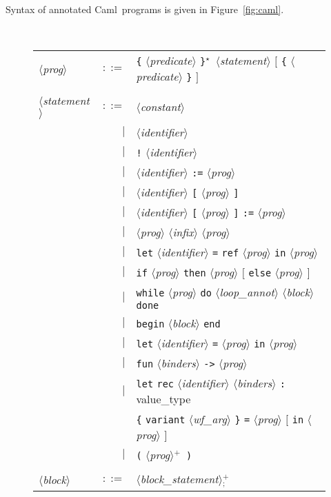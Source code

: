 \documentclass[a4paper,12pt]{report}
\newcommand{\caml}{\textsf{Caml}}
\newcommand{\te}[1]{\texttt{#1}}
\newcommand{\nt}[1]{$\langle$\textsl{#1}$\rangle$}
\newcommand{\etoile}{$^{\star}$}
\newcommand{\plus}{$^+$}
\newcommand{\plussep}[1]{$^+_#1$}
\begin{document}
Syntax of annotated \caml\ programs is given in Figure~\ref{fig:caml}.
\begin{figure}[htbp]
\begin{center}
\hrulefill\\
\begin{tabular}{lrl}
  \nt{prog} 
    & $::=$ & \te{\{} \nt{predicate} \te{\}}\etoile\
              \nt{statement} 
              $[$ \te{\{} \nt{predicate} \te{\}} $]$ \\

       & & \\[0.1em]

  \nt{statement}
    & $::=$ & \nt{constant} \\
      & $|$ & \nt{identifier} \\
      & $|$ & \te{!} \nt{identifier} \\
      & $|$ & \nt{identifier} \te{:=} \nt{prog} \\
      & $|$ & \nt{identifier} \te{[} \nt{prog} \te{]} \\
      & $|$ & \nt{identifier} \te{[} \nt{prog} \te{]} \te{:=} \nt{prog} \\
      & $|$ & \nt{prog} \nt{infix} \nt{prog} \\
      & $|$ & \te{let} \nt{identifier} \te{=} \te{ref} 
              \nt{prog} \te{in} \nt{prog} \\
      & $|$ & \te{if} \nt{prog} \te{then} \nt{prog}
              $[$ \te{else} \nt{prog} $]$ \\
      & $|$ & \te{while} \nt{prog} \te{do}
              \nt{loop\_annot} \nt{block} \te{done} \\
      & $|$ & \te{begin} \nt{block} \te{end} \\
      & $|$ & \te{let} \nt{identifier} \te{=} \nt{prog} 
              \te{in} \nt{prog} \\
      & $|$ & \te{fun} \nt{binders} \te{->} \nt{prog} \\
      & $|$ & \te{let} \te{rec} \nt{identifier} \nt{binders} \te{:}
              value\_type \\
      &     & \te{\{} \te{variant} \nt{wf\_arg} \te{\}}
              \te{=} \nt{prog} $[$ \te{in} \nt{prog} $]$ \\
      & $|$ & \te{(} \nt{prog}\plus\  \te{)} \\

      & & \\[0.1em]

  \nt{block} 
    & $::=$ & \nt{block\_statement}\plussep{\te{;}} \\


\end{tabular}
\end{center}
\end{figure}
\end{document}
